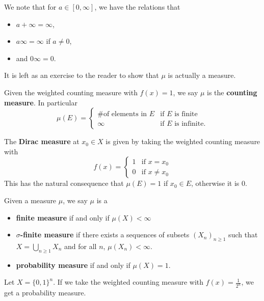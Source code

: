 \documentclass[11pt,leqno,oneside]{amsbook}
\numberwithin{thm}{section}
\newcommand{\s}{$\sigma$-} %
\renewcommand{\de}{\textbf} %
\begin{document}
\begin{rmk}
We note that for $a \in [0,\infty]$, we have the relations that
\begin{itemize}
\item $a + \infty = \infty$,
\item $a \infty = \infty$ if $a \neq 0$,
\item and $0 \infty = 0$.
\end{itemize}
\end{rmk}
It is left as an exercise to the reader to show that $\mu$ is actually
a measure.
\begin{defn}
  Given the weighted counting measure with $f(x) = 1$, we say $\mu$ is
  the \de{counting measure}. In particular
\[
    \mu(E) =
    \begin{cases}
      \text{\# of elements in }E&\text{if }E\text{ is finite} \\
      \infty&\text{if }E\text{ is infinite.}
    \end{cases}
  \]
\end{defn}
\begin{defn}
  The \de{Dirac measure} at $x_0 \in X$ is given by taking the
  weighted counting measure with \[
    f(x) =
    \begin{cases}
      1 & \text{if } x = x_0 \\
      0 & \text{if } x \neq x_0
    \end{cases}
  \]
  This has the natural consequence that $\mu(E) = 1$ if $x_0 \in E$,
  otherwise it is 0.
\end{defn}
\begin{defn}
  Given a measure $\mu$, we say $\mu$ is a
  \begin{itemize}
  \item \de{finite measure} if and only if $\mu(X) < \infty$
  \item \de{\s finite measure} if there exists a sequences of
    subsets $(X_n)_{n \geq 1}$ such that $X = \bigcup_{n \geq 1} X_n$
    and for all $n$, $\mu(X_n) < \infty$.
  \item \de{probability measure} if and only if $\mu(X) = 1$.
  \end{itemize}
\end{defn}
\begin{example}
  Let $X = \{0,1\}^n$. If we take the weighted counting measure with
  $f(x) = \frac{1}{2^n}$, we get a probability measure.
\end{example}
\end{document}
